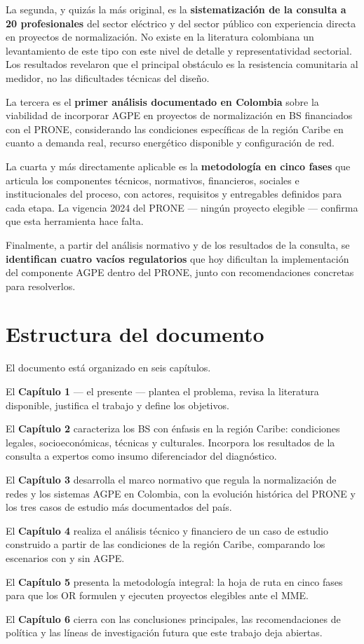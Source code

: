 La segunda, y quizás la más original, es la \textbf{sistematización de la consulta a 20 profesionales} del sector eléctrico y del sector público con experiencia directa en proyectos de normalización. No existe en la literatura colombiana un levantamiento de este tipo con este nivel de detalle y representatividad sectorial. Los resultados revelaron que el principal obstáculo es la resistencia comunitaria al medidor, no las dificultades técnicas del diseño.

La tercera es el \textbf{primer análisis documentado en Colombia} sobre la viabilidad de incorporar AGPE en proyectos de normalización en BS financiados con el PRONE, considerando las condiciones específicas de la región Caribe en cuanto a demanda real, recurso energético disponible y configuración de red.

La cuarta y más directamente aplicable es la \textbf{metodología en cinco fases} que articula los componentes técnicos, normativos, financieros, sociales e institucionales del proceso, con actores, requisitos y entregables definidos para cada etapa. La vigencia 2024 del PRONE — ningún proyecto elegible — confirma que esta herramienta hace falta.

Finalmente, a partir del análisis normativo y de los resultados de la consulta, se \textbf{identifican cuatro vacíos regulatorios} que hoy dificultan la implementación del componente AGPE dentro del PRONE, junto con recomendaciones concretas para resolverlos.


\section{Estructura del documento}
\label{sec:estructura}

El documento está organizado en seis capítulos.

El \textbf{Capítulo 1} — el presente — plantea el problema, revisa la literatura disponible, justifica el trabajo y define los objetivos.

El \textbf{Capítulo 2} caracteriza los BS con énfasis en la región Caribe: condiciones legales, socioeconómicas, técnicas y culturales. Incorpora los resultados de la consulta a expertos como insumo diferenciador del diagnóstico.

El \textbf{Capítulo 3} desarrolla el marco normativo que regula la normalización de redes y los sistemas AGPE en Colombia, con la evolución histórica del PRONE y los tres casos de estudio más documentados del país.

El \textbf{Capítulo 4} realiza el análisis técnico y financiero de un caso de estudio construido a partir de las condiciones de la región Caribe, comparando los escenarios con y sin AGPE.

El \textbf{Capítulo 5} presenta la metodología integral: la hoja de ruta en cinco fases para que los OR formulen y ejecuten proyectos elegibles ante el MME.

El \textbf{Capítulo 6} cierra con las conclusiones principales, las recomendaciones de política y las líneas de investigación futura que este trabajo deja abiertas.